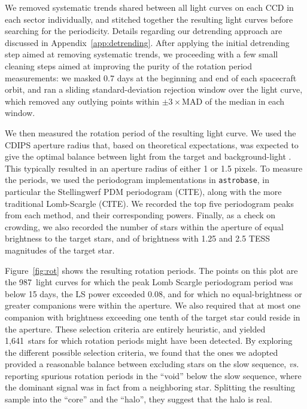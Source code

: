 \documentclass[12pt,twocolumn,tighten]{aastex63}
\newcommand{\nautorotdenominator}{1{,}641\ } %
\newcommand{\nautorotnumerator}{987\ } %
\begin{document}
We removed systematic trends shared between
all light curves on each CCD in each sector individually, and
stitched together the resulting light curves before searching for the
periodicity.  Details regarding our detrending approach are
discussed in Appendix~\ref{app:detrending}.  After applying the
initial
detrending step aimed at removing systematic trends, we proceeding
with a few small cleaning steps aimed at improving the purity of the
rotation period measurements: we masked 0.7 days at the beginning and
end of each spacecraft orbit, and ran a sliding standard-deviation
rejection window over the light curve, which removed any outlying
points within $\pm3\times$MAD of the median in each window.

We then measured the rotation period of the resulting light curve.  We
used the CDIPS aperture radius that, based on theoretical expectations,
was expected to give the optimal balance between light from the target
and background-light \citep{Sullivan_2015}.  This typically resulted in an
aperture radius of either 1 or 1.5 pixels.  To measure the periods, we
used the periodogram implementations in \texttt{astrobase}, in
particular the Stellingwerf PDM periodogram (CITE), along with the
more traditional Lomb-Scargle (CITE).  We recorded the top five
periodogram peaks from each method, and their corresponding powers.
Finally, as a check on crowding, we also recorded the number of stars
within the aperture of equal brightness to the target stars, and of
brightness with 1.25 and 2.5 TESS magnitudes of the target star.

Figure~\ref{fig:rot} shows the resulting rotation periods.  The points
on this plot are the \nautorotnumerator light curves for which the peak Lomb Scargle
periodogram period was below 15 days, the LS power exceeded 0.08, and
for which no equal-brightness or greater companions were within the aperture. 
We also required that at most one companion with brightness exceeding 
one tenth of the target star could reside in the aperture.
These
selection criteria are entirely heuristic, and yielded
\nautorotdenominator stars for which rotation periods might have been
detected.  
By exploring the different possible selection criteria, we found that
the ones we adopted provided a
reasonable balance between excluding stars on the slow sequence, {\it
vs.} reporting spurious rotation periods in the ``void'' below the
slow sequence, where the dominant signal was in fact from a
neighboring star.
Splitting the resulting sample into the ``core'' and the ``halo'', they
suggest that the halo is real.
\end{document}
